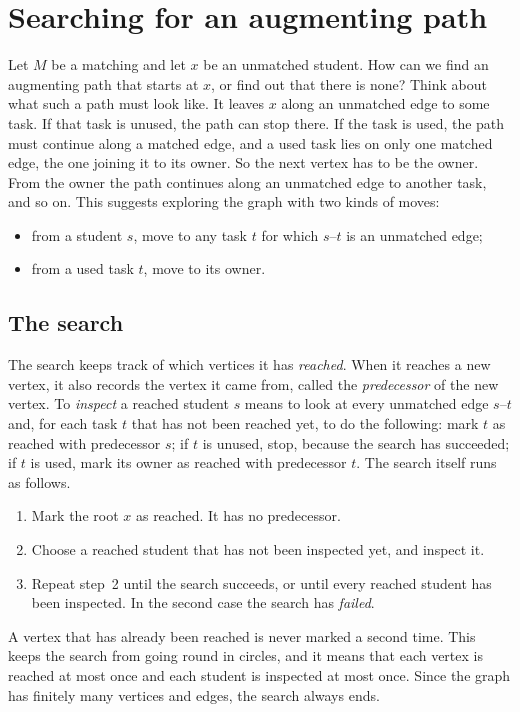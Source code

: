 \section{Searching for an augmenting path}\label{ch08:sec:search}
Let $M$ be a matching and let $x$ be an unmatched student. How can we find an augmenting path that starts at $x$, or find out that there is none? Think about what such a path must look like. It leaves $x$ along an unmatched edge to some task. If that task is unused, the path can stop there. If the task is used, the path must continue along a matched edge, and a used task lies on only one matched edge, the one joining it to its owner. So the next vertex has to be the owner. From the owner the path continues along an unmatched edge to another task, and so on. This suggests exploring the graph with two kinds of moves:
\begin{itemize}
\item from a student $s$, move to any task $t$ for which $s$--$t$ is an unmatched edge;
\item from a used task $t$, move to its owner.
\end{itemize}

\subsection*{The search}
The search keeps track of which vertices it has \emph{reached}. When it reaches a new vertex, it also records the vertex it came from, called the \emph{predecessor} of the new vertex. To \emph{inspect} a reached student $s$ means to look at every unmatched edge $s$--$t$ and, for each task $t$ that has not been reached yet, to do the following: mark $t$ as reached with predecessor $s$; if $t$ is unused, stop, because the search has succeeded; if $t$ is used, mark its owner as reached with predecessor $t$. The search itself runs as follows.
\begin{enumerate}
\item Mark the root $x$ as reached. It has no predecessor.
\item Choose a reached student that has not been inspected yet, and inspect it.
\item Repeat step~2 until the search succeeds, or until every reached student has been inspected. In the second case the search has \emph{failed}.
\end{enumerate}
A vertex that has already been reached is never marked a second time. This keeps the search from going round in circles, and it means that each vertex is reached at most once and each student is inspected at most once. Since the graph has finitely many vertices and edges, the search always ends.

